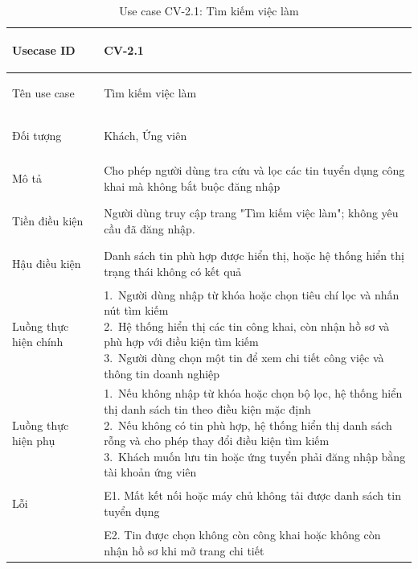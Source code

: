 \begin{table}[H]
    \centering
    \small
    \renewcommand{\arraystretch}{1.0}
    \begin{tabularx}{\textwidth}{|
        >{\bfseries\raggedright\arraybackslash}p{3.2cm}|Y|}
        \hline

        Usecase ID& CV-2.1 \\ \hline

        Tên use case & Tìm kiếm việc làm\\ \hline

        Đối tượng & Khách, Ứng viên \\ \hline

        Mô tả & Cho phép người dùng tra cứu và lọc các tin tuyển dụng công khai mà không bắt buộc đăng nhập\\ \hline

        Tiền điều kiện &
        \parbox[t]{\hsize}{
            Người dùng truy cập trang "Tìm kiếm việc làm"; không yêu cầu đã đăng nhập.\par
        } \\
        \hline

        Hậu điều kiện & Danh sách tin phù hợp được hiển thị, hoặc hệ thống hiển thị trạng thái không có kết quả \\ \hline

        Luồng thực hiện chính&
        \parbox[t]{\hsize}{
            1.\ Người dùng nhập từ khóa hoặc chọn tiêu chí lọc và nhấn nút tìm kiếm\\
            2.\ Hệ thống hiển thị các tin công khai, còn nhận hồ sơ và phù hợp với điều kiện tìm kiếm\\
            3.\ Người dùng chọn một tin để xem chi tiết công việc và thông tin doanh nghiệp
        }\\
        \hline

        Luồng thực hiện phụ&
        \parbox[t]{\hsize}{
            1.\ Nếu không nhập từ khóa hoặc chọn bộ lọc, hệ thống hiển thị danh sách tin theo điều kiện mặc định\\
            2.\ Nếu không có tin phù hợp, hệ thống hiển thị danh sách rỗng và cho phép thay đổi điều kiện tìm kiếm\\
            3.\ Khách muốn lưu tin hoặc ứng tuyển phải đăng nhập bằng tài khoản ứng viên
        }\\
        \hline
        

        Lỗi
        & E1. Mất kết nối hoặc máy chủ không tải được danh sách tin tuyển dụng\\
        & E2. Tin được chọn không còn công khai hoặc không còn nhận hồ sơ khi mở trang chi tiết\\
        \hline

    \end{tabularx}

    \caption{Use case CV-2.1: Tìm kiếm việc làm}
    \label{tab:usecase-cv21}
\end{table}


